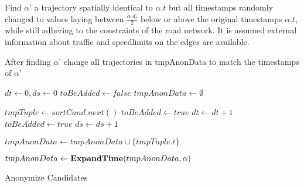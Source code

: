 \begin{algorithm}%
\dontprintsemicolon
\SetVline




{
	Find $\alpha$' a trajectory spatially identical to $\alpha.t$ but all timestamps randomly changed to values laying between $\frac{\alpha.d_t}{2}$ below or above the original timestamps $\alpha.t$, while still adhering to the constraints of the road network. It is assumed external information about traffic and speedlimits on the edges are available. \;

	After finding $\alpha$' change all trajectories in tmpAnonData to match the timestamps of $\alpha$' \;

}

{
	\;
	$dt \leftarrow 0, ds \leftarrow 0$ \;
	$toBeAdded \leftarrow false$ \;
	$tmpAnonData \leftarrow \emptyset$ \;	

	{
		$tmpTuple \leftarrow sortCand.next()$ \;
		{
			$toBeAdded \leftarrow true$ \;
			$dt \leftarrow dt +1$ \;
		}
		{
			$toBeAdded \leftarrow true$ \;
			$ds \leftarrow ds +1$ \;
		}
		{
			 \;
			$tmpAnonData \leftarrow tmpAnonData \cup \{tmpTuple.t\}$ \;

		}
	}
	 \;
	$tmpAnonData \leftarrow {\bf ExpandTime}(tmpAnonData, \alpha)$ \;
		
}

\caption{Anonymize Candidates}
\label{alg:AnonymizeCan}
\end{algorithm}
